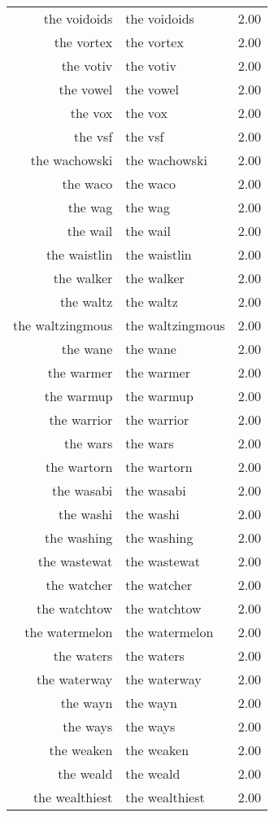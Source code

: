 \begin{table}[ht]
\begin{tabular}{rlr}
  the voidoids & the voidoids & 2.00 \\ 
  the vortex & the vortex & 2.00 \\ 
  the votiv & the votiv & 2.00 \\ 
  the vowel & the vowel & 2.00 \\ 
  the vox & the vox & 2.00 \\ 
  the vsf & the vsf & 2.00 \\ 
  the wachowski & the wachowski & 2.00 \\ 
  the waco & the waco & 2.00 \\ 
  the wag & the wag & 2.00 \\ 
  the wail & the wail & 2.00 \\ 
  the waistlin & the waistlin & 2.00 \\ 
  the walker & the walker & 2.00 \\ 
  the waltz & the waltz & 2.00 \\ 
  the waltzingmous & the waltzingmous & 2.00 \\ 
  the wane & the wane & 2.00 \\ 
  the warmer & the warmer & 2.00 \\ 
  the warmup & the warmup & 2.00 \\ 
  the warrior & the warrior & 2.00 \\ 
  the wars & the wars & 2.00 \\ 
  the wartorn & the wartorn & 2.00 \\ 
  the wasabi & the wasabi & 2.00 \\ 
  the washi & the washi & 2.00 \\ 
  the washing & the washing & 2.00 \\ 
  the wastewat & the wastewat & 2.00 \\ 
  the watcher & the watcher & 2.00 \\ 
  the watchtow & the watchtow & 2.00 \\ 
  the watermelon & the watermelon & 2.00 \\ 
  the waters & the waters & 2.00 \\ 
  the waterway & the waterway & 2.00 \\ 
  the wayn & the wayn & 2.00 \\ 
  the ways & the ways & 2.00 \\ 
  the weaken & the weaken & 2.00 \\ 
  the weald & the weald & 2.00 \\ 
  the wealthiest & the wealthiest & 2.00 \\ 

\end{tabular}
\end{table}
